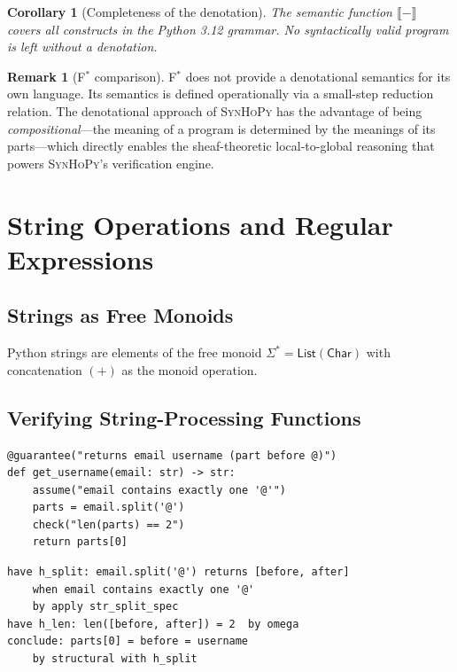 \documentclass[11pt,a4paper]{report}
\theoremstyle{definition}
\newtheorem{remark}[definition]{Remark}
\theoremstyle{plain}
\newtheorem{corollary}[definition]{Corollary}
\newcommand{\den}[1]{\llbracket #1 \rrbracket}
\newcommand{\fstar}{F$^{*}$}
\newcommand{\synhopy}{\textsc{SynHoPy}}
\begin{document}
\begin{corollary}[Completeness of the denotation]
The semantic function $\den{-}$ covers all constructs in the Python 3.12
grammar.  No syntactically valid program is left without a denotation.
\end{corollary}

\begin{remark}[\fstar{} comparison]
\fstar{} does not provide a denotational semantics for its own language.
Its semantics is defined operationally via a small-step reduction relation.
The denotational approach of \synhopy{} has the advantage of being
\emph{compositional}---the meaning of a program is determined by the meanings
of its parts---which directly enables the sheaf-theoretic local-to-global
reasoning that powers \synhopy{}'s verification engine.
\end{remark}


\chapter{String Operations and Regular Expressions}
\label{ch:strings}

\section{Strings as Free Monoids}

Python strings are elements of the free monoid $\Sigma^* = \mathsf{List}(\mathsf{Char})$
with concatenation $(+)$ as the monoid operation.

\section{Verifying String-Processing Functions}

\begin{lstlisting}[style=synhopy]
@guarantee("returns email username (part before @)")
def get_username(email: str) -> str:
    assume("email contains exactly one '@'")
    parts = email.split('@')
    check("len(parts) == 2")
    return parts[0]
\end{lstlisting}

\begin{lstlisting}[style=proof]
have h_split: email.split('@') returns [before, after]
    when email contains exactly one '@'
    by apply str_split_spec
have h_len: len([before, after]) = 2  by omega
conclude: parts[0] = before = username
    by structural with h_split
\end{lstlisting}
\end{document}
